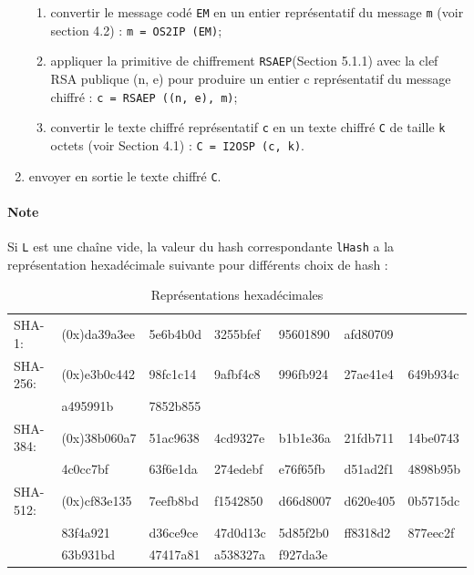 \begin{enumerate}
\begin{enumerate}
\item convertir le message codé \texttt{EM} en un entier représentatif du message \texttt{m} (voir section 4.2) : \texttt{m = OS2IP (EM)};
\item appliquer la primitive de chiffrement \texttt{RSAEP}(Section 5.1.1) avec la clef RSA publique (n, e) pour produire un entier c représentatif du message chiffré : \texttt{c = RSAEP ((n, e), m)};
\item convertir le texte chiffré représentatif \texttt{c} en un texte chiffré \texttt{C} de taille \texttt{k} octets (voir Section 4.1) : \texttt{C = I2OSP (c, k)}.\\
\end{enumerate}
\item envoyer en sortie le texte chiffré \texttt{C}.\\
\end{enumerate}
\paragraph{Note} Si \texttt{L} est une chaîne vide, la valeur du hash correspondante \texttt{lHash} a la représentation hexadécimale suivante pour différents choix de hash :


\begin{table}[H]
\centering
\begin{tabularx}{17cm}{Xllllll}
SHA-1: & (0x)da39a3ee & 5e6b4b0d & 3255bfef & 95601890 & afd80709 & \\
SHA-256: & (0x)e3b0c442 & 98fc1c14 & 9afbf4c8 & 996fb924 & 27ae41e4 & 649b934c\\
& a495991b & 7852b855 & & & &\\
SHA-384: & (0x)38b060a7 & 51ac9638 & 4cd9327e & b1b1e36a & 21fdb711 & 14be0743\\
& 4c0cc7bf & 63f6e1da & 274edebf & e76f65fb & d51ad2f1 & 4898b95b\\
SHA-512: & (0x)cf83e135 & 7eefb8bd & f1542850 & d66d8007 & d620e405 & 0b5715dc\\
& 83f4a921 & d36ce9ce & 47d0d13c & 5d85f2b0 & ff8318d2 & 877eec2f\\
& 63b931bd & 47417a81 & a538327a & f927da3e & &\\
\end{tabularx}
\caption{Représentations hexadécimales}
\label{repres_hexa}
\end{table}


